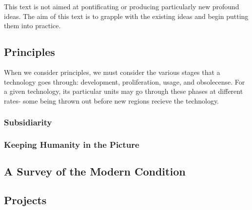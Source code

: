 \documentclass[letterpaper]{article}
\begin{document}
This text is not aimed at pontificating or producing particularly new profound ideas. The aim of this text is to grapple with the existing ideas and begin putting them into practice.

\subsection{Principles}

When we consider principles, we must consider the various stages that a technology goes through: development, proliferation, usage, and obsolecense. For a given technology, its particular units may go through these phases at different rates- some being thrown out before new regions recieve the technology.

\subsubsection{Subsidiarity}

\subsubsection{Keeping Humanity in the Picture}

\subsection{A Survey of the Modern Condition}

\subsection{Projects}
\end{document}
